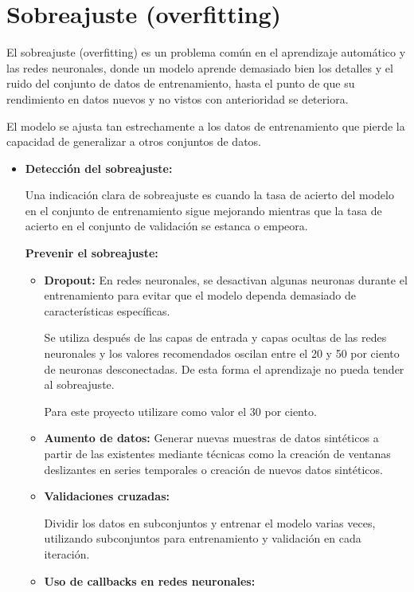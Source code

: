 \section{Sobreajuste (overfitting)}

	El sobreajuste (overfitting) es un problema común en el aprendizaje automático y las redes neuronales, donde un modelo aprende demasiado bien los detalles y el ruido del conjunto de datos de entrenamiento, hasta el punto de que su rendimiento en datos nuevos y no vistos con anterioridad se deteriora. 
	
	El modelo se ajusta tan estrechamente a los datos de entrenamiento que pierde la capacidad de generalizar a otros conjuntos de datos.
	

\begin{itemize}	
\item
\textbf{Detección del sobreajuste:}

	Una indicación clara de sobreajuste es cuando la tasa de acierto del modelo en el conjunto de entrenamiento sigue mejorando mientras que la tasa de acierto en el conjunto de validación se estanca o empeora.

\textbf{Prevenir el sobreajuste:}

	\begin{itemize}
	\item
	\textbf{Dropout:}
	En redes neuronales, se desactivan algunas neuronas durante el entrenamiento para evitar que el modelo dependa demasiado de características específicas.
	
	Se utiliza después de las capas de entrada y capas ocultas de las redes neuronales y los valores recomendados oscilan entre el 20 y 50 por ciento de neuronas desconectadas. De esta forma el aprendizaje no pueda tender al sobreajuste. 
	
	Para este proyecto utilizare como valor el 30 por ciento.
	
	\item
	\textbf{Aumento de datos:}
	Generar nuevas muestras de datos sintéticos a partir de las existentes mediante técnicas como la creación de ventanas deslizantes en series temporales o creación de nuevos datos sintéticos.
	
	\item
	\textbf{Validaciones cruzadas:}
	
	Dividir los datos en subconjuntos y entrenar el modelo varias veces, utilizando subconjuntos para entrenamiento y validación en cada iteración.
	
	\item
	\textbf{Uso de callbacks en redes neuronales:}
	

\end{itemize}
\end{itemize}
